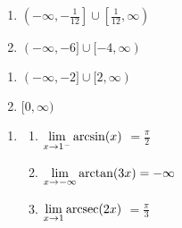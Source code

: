 \begin{multicols}{2}

\begin{enumerate}

\setcounter{enumi}{\value{HW}}

\item  $\left(-\infty, -\frac{1}{12}\right] \cup \left[\frac{1}{12}, \infty\right)$
\item  $(-\infty, -6] \cup [-4, \infty)$ 

\setcounter{HW}{\value{enumi}}

\end{enumerate}

\end{multicols}

\begin{multicols}{2}

\begin{enumerate}

\setcounter{enumi}{\value{HW}}

\item $(-\infty, -2] \cup [2, \infty)$
\item  $[0, \infty)$

\setcounter{HW}{\value{enumi}}

\end{enumerate}
\end{multicols}


\begin{enumerate}
\setcounter{enumi}{\value{HW}}


\item   \begin{multicols}{3} \begin{enumerate} \setcounter{enumi}{\value{HW}} \item $\displaystyle{ \lim_{x \rightarrow 1^{-}} \arcsin(x)}$ $=\frac{\pi}{2}$

\item  $\displaystyle{\lim_{x \rightarrow -\infty} \arctan(3x) = -\infty}$

\item  $\displaystyle{\lim_{x \rightarrow 1} \text{arcsec}(2x)}$ $= \frac{\pi}{3}$

\end{enumerate}
\end{multicols}
\end{enumerate}


